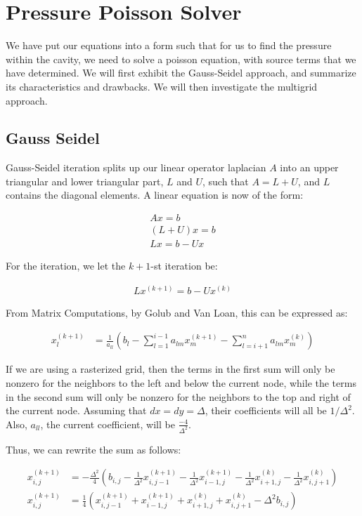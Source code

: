 \documentclass{article}
\begin{document}
\section{Pressure Poisson Solver}

We have put our equations into a form such that for us to find the pressure
	within the cavity, we need to solve a poisson equation,
	with source terms that we have determined.
We will first exhibit the Gauss-Seidel approach, and summarize its characteristics
	and drawbacks.
We will then investigate the multigrid approach.

\subsection{Gauss Seidel}

Gauss-Seidel iteration splits up our linear operator laplacian $A$ into
	an upper triangular and lower triangular part, $L$ and $U$,
	such that $A = L + U$, and $L$ contains the diagonal elements.
A linear equation is now of the form:

\begin{align}
A x = b \\
(L + U) x = b\\
L x = b - U x
\end{align}

For the iteration, we let the $k+1$-st iteration be:

\begin{align}
L x^{(k+1)} = b - U x^{(k)}
\end{align}

From Matrix Computations, by Golub and Van Loan, this can be expressed as:

\begin{align}
x_l^{(k+1)} & = \frac{1}{a_{ll}} \left( b_l 
	- \sum_{l=1}^{i-1} a_{lm} x_m^{(k+1)}
	- \sum_{l=i+1}^n a_{lm} x_m^{(k)} \right)
\end{align}

If we are using a rasterized grid, then the terms in the first
	sum will only be nonzero for the neighbors to the left
	and below the current node,
	while the terms in the second sum will only be nonzero for
	the neighbors to the top and right of the current node.
Assuming that $dx = dy = \Delta$, their coefficients will all be $1/\Delta^2$.
Also, $a_{ll}$, the current coefficient, will be $\frac{-4}{\Delta^2}$.

Thus, we can rewrite the sum as follows:

\begin{align}
x_{i,j}^{(k+1)} & = - \frac{\Delta^2}{4} \left( b_{i,j} 
	- \frac{1}{\Delta^2} x_{i,j-1}^{(k+1)}
	- \frac{1}{\Delta^2} x_{i-1,j}^{(k+1)}
	- \frac{1}{\Delta^2} x_{i+1,j}^{(k)}
	- \frac{1}{\Delta^2} x_{i,j+1}^{(k)} \right)\\
x_{i,j}^{(k+1)} & = \frac{1}{4} \left(
	x_{i,j-1}^{(k+1)}
	+ x_{i-1,j}^{(k+1)}
	+ x_{i+1,j}^{(k)}
	+ x_{i,j+1}^{(k)}
	- \Delta^2 b_{i,j} \right)
\end{align}
\end{document}
